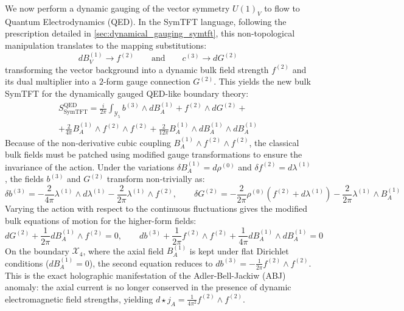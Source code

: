 \documentclass[aps,preprint,nofootinbib,preprintnumbers,eqsecnum,superscriptaddress]{revtex4}
\numberwithin{equation}{section}
\begin{document}
We now perform a dynamic gauging of the vector symmetry $U(1)_V$ to flow to Quantum Electrodynamics (QED). In the SymTFT language, following the prescription detailed in \ref{sec:dynamical_gauging_symtft}, this non-topological manipulation translates to the mapping substitutions:
\begin{equation}
    dB^{(1)}_V  \longrightarrow   f^{(2)} \qquad \text{and} \qquad c^{(3)} \longrightarrow dG^{(2)}
\end{equation}
transforming the vector background into a dynamic bulk field strength $f^{(2)}$ and its dual multiplier into a $2$-form gauge connection $G^{(2)}$. This yields the new bulk SymTFT for the dynamically gauged QED-like boundary theory:
\begin{multline}\label{eq:SymTFT_QED}
    S_{\text{SymTFT}}^{\text{QED}} = \frac{i}{2\pi} \int_{\mathcal{Y}_5}  b^{(3)} \wedge dB^{(1)}_A + f^{(2)} \wedge dG^{(2)} +\\+ \frac{2}{4\pi} B^{(1)}_A \wedge f^{(2)} \wedge f^{(2)} + \frac{2}{12\pi} B^{(1)}_A \wedge dB^{(1)}_A \wedge dB^{(1)}_A 
\end{multline}
Because of the non-derivative cubic coupling $B^{(1)}_A \wedge f^{(2)} \wedge f^{(2)}$, the classical bulk fields must be patched using modified gauge transformations to ensure the invariance of the action. Under the variations $\delta B^{(1)}_A = d\rho^{(0)}$ and $\delta f^{(2)} = d\lambda^{(1)}$, the fields $b^{(3)}$ and $G^{(2)}$ transform non-trivially as:
\begin{equation}\label{eq:gauge_trans_qed}
    \delta b^{(3)} = -\frac{2}{4\pi} \lambda^{(1)} \wedge d\lambda^{(1)} - \frac{2}{2\pi} \lambda^{(1)} \wedge f^{(2)}, \qquad \delta G^{(2)} = -\frac{2}{2\pi}\rho^{(0)}\left(f^{(2)} + d\lambda^{(1)}\right) - \frac{2}{2\pi}\lambda^{(1)} \wedge B^{(1)}_A
\end{equation}
Varying the action with respect to the continuous fluctuations gives the modified bulk equations of motion for the higher-form fields:
\begin{equation}\label{eq:ABJ_EOM}
    dG^{(2)} + \frac{1}{2\pi} dB^{(1)}_A \wedge f^{(2)} = 0, \qquad db^{(3)} + \frac{1}{2\pi} f^{(2)} \wedge f^{(2)} + \frac{1}{4\pi} dB^{(1)}_A \wedge dB^{(1)}_A = 0
\end{equation}
On the boundary $\mathcal{X}_4$, where the axial field $B^{(1)}_A$ is kept under flat Dirichlet conditions ($dB^{(1)}_A = 0$), the second equation reduces to $db^{(3)} = -\frac{1}{2\pi} f^{(2)} \wedge f^{(2)}$. This is the exact holographic manifestation of the Adler-Bell-Jackiw (ABJ) anomaly: the axial current is no longer conserved in the presence of dynamic electromagnetic field strengths, yielding $d \star j_A = \frac{1}{4\pi^2} f^{(2)} \wedge f^{(2)}$.
\end{document}
